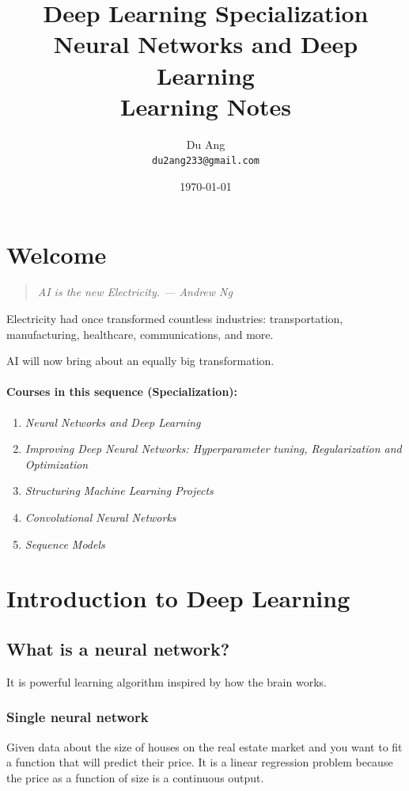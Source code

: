 \documentclass[UTF8]{article}
\title{Deep Learning Specialization \\
        Neural Networks and Deep Learning \\
        Learning Notes}
\author{Du Ang \\ \texttt{du2ang233@gmail.com} }
\date{\today}
\begin{document}
\maketitle

\tableofcontents
\newpage

\section{Welcome}
\begin{quote}
    \emph{AI is the new Electricity. --- Andrew Ng}
\end{quote}

Electricity had once transformed countless industries: transportation, manufacturing, healthcare,
communications, and more.

AI will now bring about an equally big transformation.

\paragraph{Courses in this sequence (Specialization):}
\begin{enumerate}
    \item \emph{Neural Networks and Deep Learning}
    \item \emph{Improving Deep Neural Networks: Hyperparameter tuning, Regularization and
    Optimization}
    \item \emph{Structuring Machine Learning Projects}
    \item \emph{Convolutional Neural Networks}
    \item \emph{Sequence Models}
\end{enumerate}

\section{Introduction to Deep Learning}
\subsection{What is a neural network?}
It is powerful learning algorithm inspired by how the brain works.
\subsubsection{Single neural network}
Given data about the size of houses on the real estate market and you want to fit a function that
will predict their price. It is a linear regression problem because the price as a function of size
is a continuous output.
\end{document}
